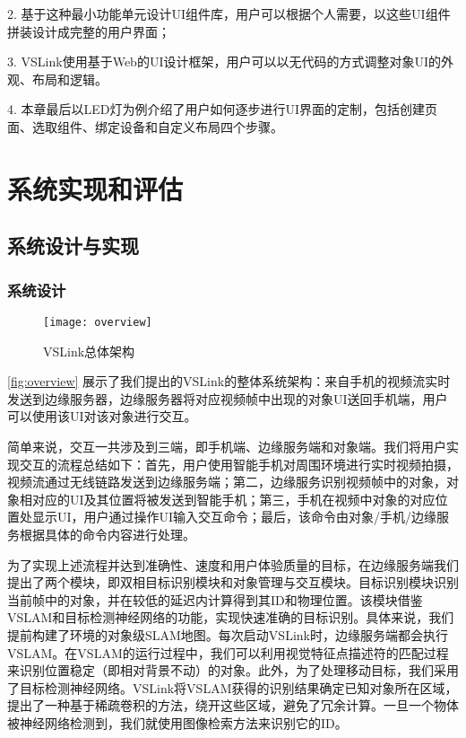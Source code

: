 2. 基于这种最小功能单元设计UI组件库，用户可以根据个人需要，以这些UI组件拼装设计成完整的用户界面；

3. VSLink使用基于Web的UI设计框架，用户可以以无代码的方式调整对象UI的外观、布局和逻辑。

4. 本章最后以LED灯为例介绍了用户如何逐步进行UI界面的定制，包括创建页面、选取组件、绑定设备和自定义布局四个步骤。

\chapter{系统实现和评估}
\label{chap:eval}

\section{系统设计与实现}
\subsection{系统设计}
\label{sec:arch}

\begin{figure}[htbp]
	\centering
	\texttt{[image: overview]}
	\caption{VSLink总体架构}
	\label{fig:overview}
\end{figure}

\autoref{fig:overview} 展示了我们提出的VSLink的整体系统架构：来自手机的视频流实时发送到边缘服务器，边缘服务器将对应视频帧中出现的对象UI送回手机端，用户可以使用该UI对该对象进行交互。

简单来说，交互一共涉及到三端，即手机端、边缘服务端和对象端。我们将用户实现交互的流程总结如下：首先，用户使用智能手机对周围环境进行实时视频拍摄，视频流通过无线链路发送到边缘服务端；第二，边缘服务识别视频帧中的对象，对象相对应的UI及其位置将被发送到智能手机；第三，手机在视频中对象的对应位置处显示UI，用户通过操作UI输入交互命令；最后，该命令由对象/手机/边缘服务根据具体的命令内容进行处理。

为了实现上述流程并达到准确性、速度和用户体验质量的目标，在边缘服务端我们提出了两个模块，即双相目标识别模块和对象管理与交互模块。目标识别模块识别当前帧中的对象，并在较低的延迟内计算得到其ID和物理位置。该模块借鉴VSLAM和目标检测神经网络的功能，实现快速准确的目标识别。具体来说，我们提前构建了环境的对象级SLAM地图。每次启动VSLink时，边缘服务端都会执行VSLAM。在VSLAM的运行过程中，我们可以利用视觉特征点描述符的匹配过程来识别位置稳定（即相对背景不动）的对象。此外，为了处理移动目标，我们采用了目标检测神经网络。VSLink将VSLAM获得的识别结果确定已知对象所在区域，提出了一种基于稀疏卷积的方法，绕开这些区域，避免了冗余计算。一旦一个物体被神经网络检测到，我们就使用图像检索方法来识别它的ID。

